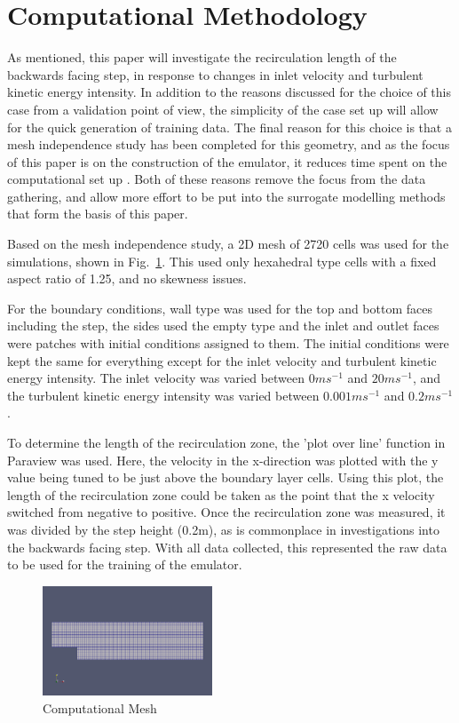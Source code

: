 \documentclass[conference]{IEEEtran}
\begin{document}
\clearpage
\section{Computational Methodology}
As mentioned, this paper will investigate the recirculation length of the backwards facing step, in response to changes in inlet velocity and turbulent kinetic energy intensity. In addition to the reasons discussed for the choice of this case from a validation point of view, the simplicity of the case set up will allow for the quick generation of training data. The final reason for this choice is that a mesh independence study has been completed for this geometry, and as the focus of this paper is on the construction of the emulator, it reduces time spent on the computational set up \cite{jackson_ecmm148_2023}. Both of these reasons remove the focus from the data gathering, and allow more effort to be put into the surrogate modelling methods that form the basis of this paper.

Based on the mesh independence study, a 2D mesh of 2720 cells was used for the simulations, shown in Fig.~\ref{fig:base_mesh}. This used only hexahedral type cells with a fixed aspect ratio of 1.25, and no skewness issues.

For the boundary conditions, wall type was used for the top and bottom faces including the step, the sides used the empty type and the inlet and outlet faces were patches with initial conditions assigned to them. The initial conditions were kept the same for everything except for the inlet velocity and turbulent kinetic energy intensity. The inlet velocity was varied between $0 ms^{-1}$ and $20 ms^{-1}$, and the turbulent kinetic energy intensity was varied between $0.001 ms^{-1}$ and $0.2 ms^{-1}$.

To determine the length of the recirculation zone, the 'plot over line' function in Paraview was used. Here, the velocity in the x-direction was plotted with the y value being tuned to be just above the boundary layer cells. Using this plot, the length of the recirculation zone could be taken as the point that the x velocity switched from negative to positive. Once the recirculation zone was measured, it was divided by the step height (0.2m), as is commonplace in investigations into the backwards facing step. With all data collected, this represented the raw data to be used for the training of the emulator.

\begin{figure}
    \centering
    \includegraphics[width = 0.45\textwidth]{Images/base_mesh.png}
    \caption{Computational Mesh}
    \label{fig:base_mesh}
\end{figure}
\end{document}

